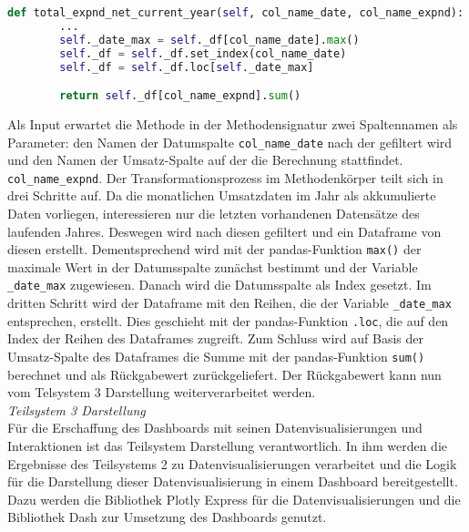     \begin{lstlisting}[language=Python, caption=Beispiel Methode Exenditures class]
    def total_expnd_net_current_year(self, col_name_date, col_name_expnd):
        ... 
        self._date_max = self._df[col_name_date].max()
        self._df = self._df.set_index(col_name_date)
        self._df = self._df.loc[self._date_max]

        return self._df[col_name_expnd].sum()  
    \end{lstlisting}

    Als Input erwartet die Methode in der Methodensignatur zwei Spaltennamen als Parameter: den Namen der Datumspalte \texttt{col\_name\_date} nach der gefiltert wird
    und den Namen der Umsatz-Spalte auf der die Berechnung stattfindet.
    \texttt{col\_name\_expnd}. Der Transformationsprozess im Methodenkörper teilt sich in drei Schritte auf. Da die monatlichen Umsatzdaten im Jahr als 
    akkumulierte Daten vorliegen, interessieren nur die letzten vorhandenen Datensätze des laufenden Jahres. Deswegen
    wird nach diesen gefiltert und ein Dataframe von diesen erstellt. Dementsprechend wird mit der pandas-Funktion \texttt{max()} 
    der maximale Wert in der Datumsspalte zunächst bestimmt und der Variable \texttt{\_date\_max} zugewiesen. Danach wird die Datumsspalte als Index gesetzt. 
    Im dritten Schritt wird der Dataframe mit den Reihen, die der Variable \texttt{\_date\_max} entsprechen, erstellt. Dies geschieht mit der pandas-Funktion \texttt{.loc}, die
    auf den Index der Reihen des Dataframes zugreift. Zum Schluss wird auf Basis der Umsatz-Spalte des Dataframes die Summe mit der pandas-Funktion \texttt{sum()} berechnet 
    und als Rückgabewert zurückgeliefert. Der Rückgabewert kann nun vom Telsystem 3 Darstellung weiterverarbeitet werden.\\


    \noindent
    \textit{Teilsystem 3 Darstellung}\\
    Für die Erschaffung des Dashboards mit seinen Datenvisualisierungen und Interaktionen ist das Teilsystem Darstellung verantwortlich.
    In ihm werden die Ergebnisse des Teilsystems 2 zu Datenvisualisierungen verarbeitet und die Logik für die Darstellung dieser Datenvisualisierung 
    in einem Dashboard bereitgestellt.
    Dazu werden die Bibliothek Plotly Express für die Datenvisualisierungen und die Bibliothek Dash zur Umsetzung des Dashboards genutzt. 
    
